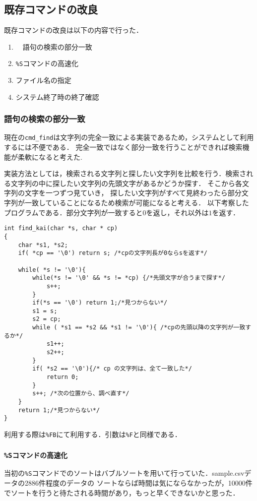 \documentclass[a4j,11pt]{jarticle}
\begin{document}
\subsection{既存コマンドの改良}\label{sec:kison}
既存コマンドの改良は以下の内容で行った．
\begin{enumerate}
\setlength{\parskip}{2pt} \setlength{\itemsep}{2pt}
    \item　語句の検索の部分一致
    \item \verb|%S|コマンドの高速化
　　 \item ファイル名の指定
    \item システム終了時の終了確認
\end{enumerate}
\subsubsection{語句の検索の部分一致}
現在の\verb|cmd_find|は文字列の完全一致による実装であるため，システムとして利用するには不便である．
完全一致ではなく部分一致を行うことができれば検索機能が柔軟になると考えた.

実装方法としては，検索される文字列と探したい文字列を比較を行う．検索される文字列の中に探したい文字列の先頭文字があるかどうか探す．
そこから各文字列の文字を一つずつ見ていき，
探したい文字列がすべて見終わったら部分文字列が一致していることになるため検索が可能になると考える．
以下考察したプログラムである．部分文字列が一致すると$0$を返し，それ以外は$1$を返す．
\begin{verbatim}
int find_kai(char *s, char * cp)
{
	char *s1, *s2;
	if( *cp == '\0') return s; /*cpの文字列長が0ならsを返す*/ 

	while( *s != '\0'){
		while(*s != '\0' && *s != *cp) {/*先頭文字が合うまで探す*/
			s++;
		}
		if(*s == '\0') return 1;/*見つからない*/
		s1 = s;
		s2 = cp;
		while ( *s1 == *s2 && *s1 != '\0'){ /*cpの先頭以降の文字列が一致するか*/
			s1++;
			s2++;
		}
		if( *s2 == '\0'){/* cp の文字列は、全て一致した*/
			return 0;
		}
		s++; /*次の位置から、調べ直す*/
	}
	return 1;/*見つからない*/
}
\end{verbatim}
利用する際は\verb|%FB|にて利用する．引数は\verb|%F|と同様である．
\subsubsection{\texttt{\%Sコマンドの高速化}}
当初の\verb|%S|コマンドでのソートはバブルソートを用いて行っていた．sample.csvデータの2886件程度のデータの
ソートならば時間は気にならなかったが，10000件でソートを行うと待たされる時間があり，もっと早くできないかと思った．
\end{document}
